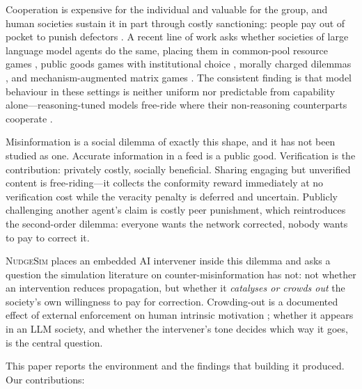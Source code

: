 \documentclass{article}
\begin{document}
Cooperation is expensive for the individual and valuable for the group, and
human societies sustain it in part through costly sanctioning: people pay out of
pocket to punish defectors \citep{fehr2002,guerek2006,ostrom1990}. A recent line
of work asks whether societies of large language model agents do the same,
placing them in common-pool resource games \citep{piatti2024govsim}, public
goods games with institutional choice \citep{piedrahita2025sanctsim}, morally
charged dilemmas \citep{backmann2025moralsim}, and mechanism-augmented matrix
games \citep{tewolde2026coopeval}. The consistent finding is that model
behaviour in these settings is neither uniform nor predictable from capability
alone---reasoning-tuned models free-ride where their non-reasoning counterparts
cooperate \citep{piedrahita2025sanctsim,tewolde2026coopeval}.

Misinformation is a social dilemma of exactly this shape, and it has not been
studied as one. Accurate information in a feed is a public good. Verification is
the contribution: privately costly, socially beneficial. Sharing engaging but
unverified content is free-riding---it collects the conformity reward
immediately at no verification cost while the veracity penalty is deferred and
uncertain. Publicly challenging another agent's claim is costly peer punishment,
which reintroduces the second-order dilemma: everyone wants the network
corrected, nobody wants to pay to correct it.

\textsc{NudgeSim} places an embedded AI intervener inside this dilemma and asks
a question the simulation literature on counter-misinformation has not: not
whether an intervention reduces propagation, but whether it \emph{catalyses or
crowds out} the society's own willingness to pay for correction. Crowding-out is
a documented effect of external enforcement on human intrinsic motivation
\citep{fehr2003,bowles2008}; whether it appears in an LLM society, and whether
the intervener's tone decides which way it goes, is the central question.

This paper reports the environment and the findings that building it produced.
Our contributions:
\end{document}
